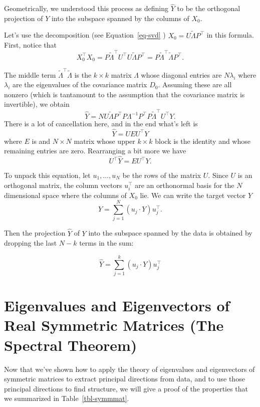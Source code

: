 \documentclass[
  11pt,
  letterpaper,
]{scrbook}
\theoremstyle{plain}
\theoremstyle{plain}
\theoremstyle{remark}
\begin{document}
Geometrically, we understood this process as defining \(\hat{Y}\) to be
the orthogonal projection of \(Y\) into the subspace spanned by the
columns of \(X_{0}\).

Let's use the decomposition (see Equation~\ref{eq-svd} )
\(X_{0}=U\tilde{\Lambda}P^{\intercal}\) in this formula. First, notice
that \[
X_{0}^{\intercal}X_{0}= P\tilde{\Lambda}^{\intercal}U^{\intercal}U\tilde{\Lambda}P^{\intercal} = P\tilde{\Lambda}^{\intercal}\tilde{\Lambda}P^{\intercal}.
\]

The middle term \(\tilde{\Lambda}^{\intercal}\tilde{\Lambda}\) is the
\(k\times k\) matrix \(\Lambda\) whose diagonal entries are
\(N\lambda_{i}\) where \(\lambda_{i}\) are the eigenvalues of the
covariance matrix \(D_{0}\). Assuming these are all nonzero (which is
tantamount to the assumption that the covariance matrix is invertible),
we obtain \[
\hat{Y} = NU\tilde{\Lambda}P^{\intercal}P\Lambda^{-1}P^{\intercal}P\tilde{\Lambda}^{\intercal}U^{\intercal}Y.
\] There is a lot of cancellation here, and in the end what's left is \[
\hat{Y}=UEU^{\intercal}Y
\] where \(E\) is and \(N\times N\) matrix whose upper \(k\times k\)
block is the identity and whose remaining entries are zero. Rearranging
a bit more we have \[
U^{\intercal}\hat{Y} = EU^{\intercal}Y.
\]

To unpack this equation, let \(u_{1},\ldots, u_{N}\) be the rows of the
matrix \(U\). Since \(U\) is an orthogonal matrix, the column vectors
\(u_{i}^{\intercal}\) are an orthonormal basis for the \(N\) dimensional
space where the columns of \(X_{0}\) lie. We can write the target vector
\(Y\) \[
Y = \sum_{j=1}^{N} (u_{j}\cdot Y)u_{j}^{\intercal}.
\]

Then the projection \(\hat{Y}\) of \(Y\) into the subspace spanned by
the data is obtained by dropping the last \(N-k\) terms in the sum:

\[
\hat{Y}=\sum_{j=1}^{k} (u_{j}\cdot Y)u_{j}^{\intercal}
\]

\hypertarget{sec-spectraltheorem}{%
\section{Eigenvalues and Eigenvectors of Real Symmetric Matrices (The
Spectral Theorem)}\label{sec-spectraltheorem}}

Now that we've shown how to apply the theory of eigenvalues and
eigenvectors of symmetric matrices to extract principal directions from
data, and to use those principal directions to find structure, we will
give a proof of the properties that we summarized in
Table~\ref{tbl-symmmat}.
\end{document}

